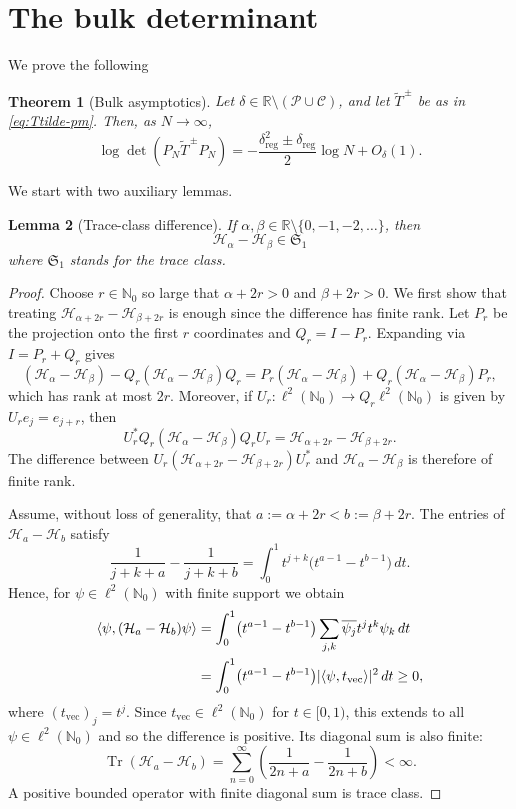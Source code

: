 \documentclass[11pt,a4paper,reqno]{amsart}
\newtheorem{theorem}{Theorem}[section]
\newtheorem{lemma}[theorem]{Lemma}
\theoremstyle{remark}
\newcommand{\Nzero}{\mathbb N_0}
\newcommand{\R}{\mathbb R}
\newcommand{\Hh}{\mathcal H}
\newcommand{\Tr}{\operatorname{Tr}}
\newcommand{\id}{I}
\newcommand{\cS}{\mathfrak S_1}
\DeclarePairedDelimiter{\abs}{\lvert}{\rvert}
\let\<\langle
\let\>\rangle
\begin{document}
\section{The bulk determinant}

We prove the following
\begin{theorem}[Bulk asymptotics]\label{bulk-asymp}
Let $\delta\in\R\setminus(\mathcal P\cup\mathcal C)$, and let
$\widetilde T^{\,\pm}$ be as in \eqref{eq:Ttilde-pm}. Then, as $N\to\infty$,
\begin{equation}\label{eq:bulk-asymptotic}
 \log\det(P_N\widetilde T^{\,\pm}P_N)
 =-\frac{\delta_{\text{reg}}^2\pm\delta_{\text{reg}}}{2}\log N+O_\delta(1).
\end{equation}
\end{theorem}

We start with two auxiliary lemmas.

\begin{lemma}[Trace-class difference]\label{lem:trace-class-shift}
If $\alpha,\beta\in\mathbb R\setminus\{0,-1,-2,\ldots\}$, then
\begin{equation}\label{eq:trace-class-difference}
 \Hh_\alpha-\Hh_\beta\in\cS
\end{equation}
where $\cS$ stands for the trace class.
\end{lemma}

\begin{proof}
Choose $r\in\Nzero$ so large that $\alpha+2r>0$ and $\beta+2r>0$. We
first show that treating $\Hh_{\alpha+2r}-\Hh_{\beta+2r}$ is enough
since the difference has finite rank.
Let $P_r$ be the projection onto the first $r$ coordinates and
$Q_r=\id-P_r$.
Expanding via $\id = P_r + Q_r$ gives
\[
 (\Hh_\alpha-\Hh_\beta) - Q_r(\Hh_\alpha-\Hh_\beta)Q_r=P_r(\Hh_\alpha-\Hh_\beta)+Q_r(\Hh_\alpha-\Hh_\beta)P_r,
\]
which has rank at most $2r$.  Moreover, if
$U_r:\ell^2(\Nzero)\to Q_r\ell^2(\Nzero)$ is given by
$U_re_j=e_{j+r}$, then
\[
 U_r^*Q_r(\Hh_\alpha-\Hh_\beta)Q_rU_r
 =
 \Hh_{\alpha+2r}-\Hh_{\beta+2r}.
\]
The difference between $U_r(\Hh_{\alpha+2r}-\Hh_{\beta+2r})U_r^*$ and
$\Hh_\alpha-\Hh_\beta$ is therefore of finite rank.

Assume, without loss of generality, that
$a:=\alpha+2r<b:=\beta+2r$.  The entries of $\Hh_a-\Hh_b$ satisfy
\[
 \frac1{j+k+a}-\frac1{j+k+b}
 =\int_0^1 t^{j+k}\bigl(t^{a-1}-t^{b-1}\bigr)\,dt.
\]
Hence, for $\psi\in\ell^2(\Nzero)$ with finite support we obtain
\begin{align}
    \<\psi, (\Hh_a - \Hh_b)\psi \>
    &= \int_0^1\bigl(t^{a-1}-t^{b-1}\bigr) \sum_{j,k} \overline{\psi_j} t^j t^k \psi_k\,dt \\
    &= \int_0^1\bigl(t^{a-1}-t^{b-1}\bigr) \abs{\< \psi, t_{\text{vec}} \>}^2\,dt \geq 0,
\end{align}
where $(t_{\text{vec}})_j = t^j$. Since
$t_{\text{vec}}\in\ell^2(\Nzero)$ for $t\in [0,1)$, this extends to
all $\psi\in\ell^2(\Nzero)$ and so the difference is positive. Its
diagonal sum is also finite:
\[
\Tr(\Hh_a - \Hh_b) =
 \sum_{n=0}^\infty
 \left(\frac1{2n+a}-\frac1{2n+b}\right)<\infty.
\]
A positive bounded operator with finite diagonal sum is trace class.
\end{proof}
\end{document}

